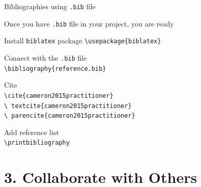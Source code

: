 \documentclass[13pt]{beamer}
\newcommand{\itemA}{\item[\textcolor{black}{\textbullet}]}
\newcommand{\green}{\textcolor{colorgreen}}
\begin{document}
\begin{frame}{Bibliographies using \texttt{.bib} file}

 \begin{fullpageitemize}
        
    \itemA Once you have \texttt{.bib} file in your project, you are ready \hfill \break
        \begin{fullpageitemize}
        \item [\textcolor{black}{\textopenbullet}] Install \green{\texttt{biblatex}} package 
        {\scriptsize \texttt{\green{\textbackslash usepackage}\{biblatex\}}}
        
        \item [\textcolor{black}{\textopenbullet}] Connect with the \texttt{.bib} file \\  {\footnotesize\texttt{\green{\textbackslash bibliography}\{reference.bib\}}}
        \item [\textcolor{black}{\textopenbullet}] Cite \\ 
        {\footnotesize\texttt{\green{\textbackslash cite}\{cameron2015practitioner\}}} \hspace{10mm}
        {\latolightfont \cite{cameron2015practitioner}}\\
        {\footnotesize\texttt{\green{\textbackslash
        textcite}\{cameron2015practitioner\}}} \hspace{4mm}
        {\latolightfont \textcite{cameron2015practitioner}}\\
        {\footnotesize \texttt{\green{\textbackslash
        parencite}\{cameron2015practitioner\}}} \hspace{2mm}
        {\latolightfont \parencite{cameron2015practitioner}}\\
        
        \item [\textcolor{black}{\textopenbullet}] Add reference list\\
        {\footnotesize \texttt{\green{\textbackslash printbibliography}}}
        
        
        \end{fullpageitemize}
\end{fullpageitemize}

\end{frame}

\section{3. Collaborate with Others}
\end{document}
